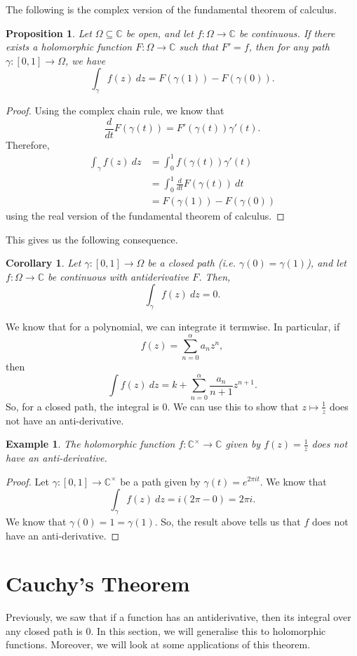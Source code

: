 \documentclass[a4paper, openany]{memoir}
\theoremstyle{definition}
\theoremstyle{plain}
\newtheorem{proposition}[definition]{Proposition}
\newtheorem{corollary}[definition]{Corollary}
\newtheorem{example}[definition]{Example}
\begin{document}
The following is the complex version of the fundamental theorem of calculus.
\begin{proposition}
Let $\Omega \subseteq \mathbb{C}$ be open, and let $f: \Omega \to \mathbb{C}$ be continuous. If there exists a holomorphic function $F: \Omega \to \mathbb{C}$ such that $F' = f$, then for any path $\gamma: [0, 1] \to \Omega$, we have
\[\int_\gamma f(z) \ dz = F(\gamma(1)) - F(\gamma(0)).\]
\end{proposition}
\begin{proof}
Using the complex chain rule, we know that
\[\frac{d}{dt}F(\gamma(t)) = F'(\gamma(t)) \gamma'(t).\]
Therefore,
\begin{align*}
    \int_\gamma f(z) \ dz &= \int_0^1 f(\gamma(t)) \gamma'(t) \\
    &= \int_0^1 \frac{d}{dt} F(\gamma(t)) \ dt \\
    &= F(\gamma(1)) - F(\gamma(0))
\end{align*}
using the real version of the fundamental theorem of calculus.
\end{proof}

This gives us the following consequence.
\begin{corollary}
Let $\gamma: [0, 1] \to \Omega$ be a closed path (i.e. $\gamma(0) = \gamma(1)$), and let $f: \Omega \to \mathbb{C}$ be continuous with antiderivative $F$. Then,
\[\int_\gamma f(z) \ dz = 0.\]
\end{corollary}
We know that for a polynomial, we can integrate it termwise. In particular, if
\[f(z) = \sum_{n=0}^{\alpha} a_n z^n,\]
then
\[\int f(z) \ dz = k + \sum_{n=0}^\alpha \frac{a_n}{n+1} z^{n+1}.\]
So, for a closed path, the integral is 0. We can use this to show that $z \mapsto \frac{1}{z}$ does not have an anti-derivative.
\begin{example}
The holomorphic function $f: \mathbb{C}^\times \to \mathbb{C}$ given by $f(z) = \frac{1}{z}$ does not have an anti-derivative.
\end{example}
\begin{proof}
Let $\gamma: [0, 1] \to \mathbb{C}^\times$ be a path given by $\gamma(t) = e^{2\pi it}$. We know that
\[\int_\gamma f(z) \ dz = i(2\pi - 0) = 2\pi i.\]
We know that $\gamma(0) = 1 = \gamma(1)$. So, the result above tells us that $f$ does not have an anti-derivative.
\end{proof}

\newpage

\section{Cauchy's Theorem}
Previously, we saw that if a function has an antiderivative, then its integral over any closed path is 0. In this section, we will generalise this to holomorphic functions. Moreover, we will look at some applications of this theorem.
\end{document}
